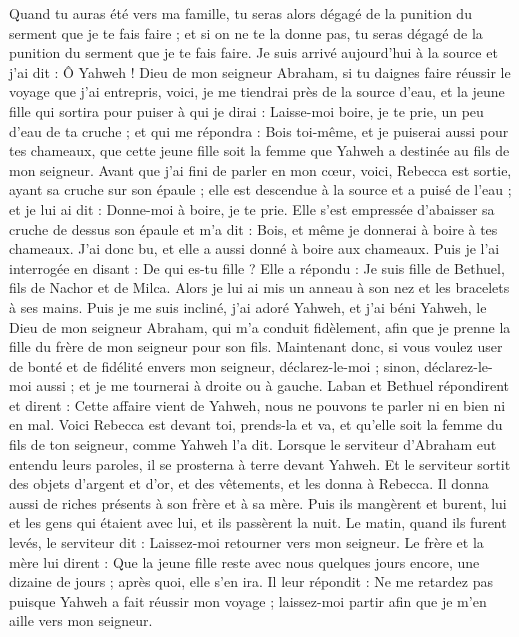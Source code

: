 \begin{multicols}{2}
Quand tu auras été vers ma famille, tu seras alors dégagé de la punition du serment que je te fais faire ; et si on ne te la donne pas, tu seras dégagé de la punition du serment que je te fais faire.
Je suis arrivé aujourd'hui à la source et j'ai dit : Ô Yahweh ! Dieu de mon seigneur Abraham, si tu daignes faire réussir le voyage que j'ai entrepris,
voici, je me tiendrai près de la source d'eau, et la jeune fille qui sortira pour puiser à qui je dirai : Laisse-moi boire, je te prie, un peu d'eau de ta cruche ; et qui me répondra :
Bois toi-même, et je puiserai aussi pour tes chameaux, que cette jeune fille soit la femme que Yahweh a destinée au fils de mon seigneur.
Avant que j'ai fini de parler en mon cœur, voici, Rebecca est sortie, ayant sa cruche sur son épaule ; elle est descendue à la source et a puisé de l'eau ; et je lui ai dit : Donne-moi à boire, je te prie.
Elle s'est empressée d'abaisser sa cruche de dessus son épaule et m'a dit : Bois, et même je donnerai à boire à tes chameaux. J'ai donc bu, et elle a aussi donné à boire aux chameaux.
Puis je l'ai interrogée en disant : De qui es-tu fille ? Elle a répondu : Je suis fille de Bethuel, fils de Nachor et de Milca. Alors je lui ai mis un anneau à son nez et les bracelets à ses mains.
Puis je me suis incliné, j'ai adoré Yahweh, et j'ai béni Yahweh, le Dieu de mon seigneur Abraham, qui m'a conduit fidèlement, afin que je prenne la fille du frère de mon seigneur pour son fils.
Maintenant donc, si vous voulez user de bonté et de fidélité envers mon seigneur, déclarez-le-moi ; sinon, déclarez-le-moi aussi ; et je me tournerai à droite ou à gauche.
Laban et Bethuel répondirent et dirent : Cette affaire vient de Yahweh, nous ne pouvons te parler ni en bien ni en mal.
Voici Rebecca est devant toi, prends-la et va, et qu'elle soit la femme du fils de ton seigneur, comme Yahweh l'a dit.
Lorsque le serviteur d'Abraham eut entendu leurs paroles, il se prosterna à terre devant Yahweh.
Et le serviteur sortit des objets d'argent et d'or, et des vêtements, et les donna à Rebecca. Il donna aussi de riches présents à son frère et à sa mère.
Puis ils mangèrent et burent, lui et les gens qui étaient avec lui, et ils passèrent la nuit. Le matin, quand ils furent levés, le serviteur dit : Laissez-moi retourner vers mon seigneur.
Le frère et la mère lui dirent : Que la jeune fille reste avec nous quelques jours encore, une dizaine de jours ; après quoi, elle s'en ira.
Il leur répondit : Ne me retardez pas puisque Yahweh a fait réussir mon voyage ; laissez-moi partir afin que je m'en aille vers mon seigneur.

\end{multicols}
